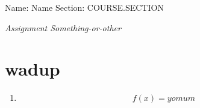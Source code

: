 \documentclass[12pt, 14paper]{report}
\theoremstyle{definition}
\begin{document}
Name: Name \hspace{10mm} Section: COURSE.SECTION

\textit{Assignment Something-or-other}

\section*{wadup}

\begin{enumerate}[label=(\alph*)]
\item
\begin{align}
    f(x) = yo mum
\end{align}
\end{enumerate}
\end{document}
